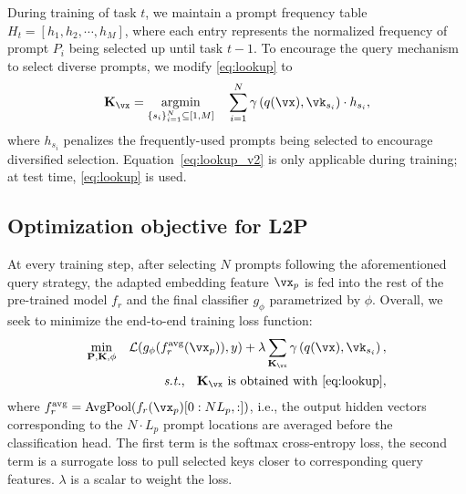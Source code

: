 \documentclass[10pt,twocolumn,letterpaper]{article}
\newcommand{\zifeng}[1]{\textcolor{black}{#1}}
\newcommand{\methodabbr}{L2P\xspace}
\def\pp{\mathbf{P}}
\def\kk{\mathbf{K}}
\begin{document}
During training of task $t$, we maintain a prompt frequency table $H_t = [h_1, h_2, \cdots, h_M]$, where each entry represents the normalized frequency of prompt $P_i$ being selected up until task $t-1$. 
To encourage the query mechanism to select diverse prompts, we modify \eqref{eq:lookup} to
\begin{equation}
\label{eq:lookup_v2}
    \zifeng{\kk_\vx} = \underset{\{s_i\}_{i=1}^{N} \subseteq [1, M] }{\operatorname{argmin}} \quad \sum_{i=1}^{N} \gamma\left({q(\vx), \vk_{s_i}}\right) \cdot h_{s_i},
\end{equation}
where $h_{s_i}$ penalizes the frequently-used prompts being selected to encourage diversified selection. 
Equation~\ref{eq:lookup_v2} is only applicable during training; at test time, \eqref{eq:lookup} is used.



\subsection{Optimization objective for \methodabbr}

\label{sec:training}
At every training step, after selecting $N$ prompts following the aforementioned query strategy, the adapted embedding feature $\vx_p$ is fed into the rest of the pre-trained model $f_r$ and the final classifier $g_{\phi}$ parametrized by $\phi$. 
Overall, we seek to minimize the end-to-end training loss function:
\begin{equation} \label{eq:full_loss}
\begin{split}
\underset{{\pp, \zifeng{\kk}, \phi}}{\operatorname{min}}\quad\mathcal{L}(g_{\phi} (f_r^{\text{avg}}(\vx_p)), y) + \lambda \sum_{\kk_{\vx}} \gamma\left({q(\vx), \vk_{s_i}}\right), \\ \text{\textit{s.t.}, \; \zifeng{$\kk_{\vx}$} is obtained with \eqref{eq:lookup}},
\end{split}
\end{equation}
where $f_r^{\text{avg}} = \text{AvgPool}(f_r(\vx_p)[\zifeng{0:NL_p},:])$, i.e., the output hidden vectors corresponding to the $N\cdot L_p$ prompt locations are averaged before the classification head.
The first term is the softmax cross-entropy loss, the second term is a surrogate loss to pull selected keys closer to corresponding query features. $\lambda$ is a scalar to weight the loss. 
\end{document}

